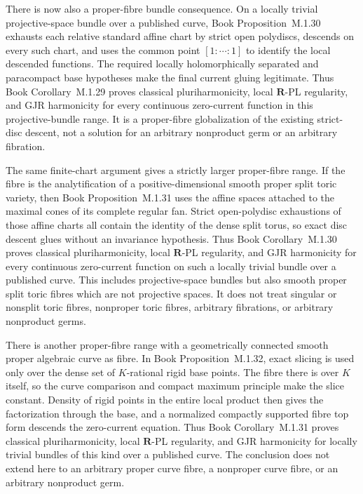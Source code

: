 \documentclass[11pt,a4paper]{article}
\theoremstyle{definition}
\theoremstyle{remark}
\begin{document}
There is now also a proper-fibre bundle consequence.  On a locally trivial
projective-space bundle over a published curve,
Book Proposition~M.1.30 exhausts each relative standard
affine chart by strict open polydiscs, descends on every such chart, and uses
the common point \([1:\cdots:1]\) to identify the local descended functions.
The required locally holomorphically separated and paracompact base
hypotheses make the final current gluing legitimate.  Thus
Book Corollary~M.1.29 proves classical
pluriharmonicity, local \(\mathbf R\)-PL regularity, and GJR harmonicity for
every continuous zero-current function in this projective-bundle range.  It
is a proper-fibre globalization of the existing strict-disc descent, not a
solution for an arbitrary nonproduct germ or an arbitrary fibration.

The same finite-chart argument gives a strictly larger proper-fibre range.
If the fibre is the analytification of a positive-dimensional smooth proper
split toric variety, then
Book Proposition~M.1.31 uses the affine
spaces attached to the maximal cones of its complete regular fan.  Strict
open-polydisc exhaustions of those affine charts all contain the identity of
the dense split torus, so exact disc descent glues without an invariance
hypothesis.  Thus
Book Corollary~M.1.30 proves
classical pluriharmonicity, local \(\mathbf R\)-PL regularity, and GJR
harmonicity for every continuous zero-current function on such a locally
trivial bundle over a published curve.  This includes projective-space
bundles but also smooth proper split toric fibres which are not projective
spaces.  It does not treat singular or nonsplit toric fibres, nonproper
toric fibres, arbitrary fibrations, or arbitrary nonproduct germs.

There is another proper-fibre range with a geometrically connected smooth
proper algebraic curve as fibre.  In
Book Proposition~M.1.32, exact slicing is used
only over the dense set of \(K\)-rational rigid base points.  The fibre
there is over \(K\) itself, so the curve comparison and compact maximum
principle make the slice constant.  Density of rigid points in the entire
local product then gives the factorization through the base, and a normalized
compactly supported fibre top form descends the zero-current equation.  Thus
Book Corollary~M.1.31 proves classical
pluriharmonicity, local \(\mathbf R\)-PL regularity, and GJR harmonicity for
locally trivial bundles of this kind over a published curve.  The conclusion
does not extend here to an arbitrary proper curve fibre, a nonproper curve
fibre, or an arbitrary nonproduct germ.
\end{document}
